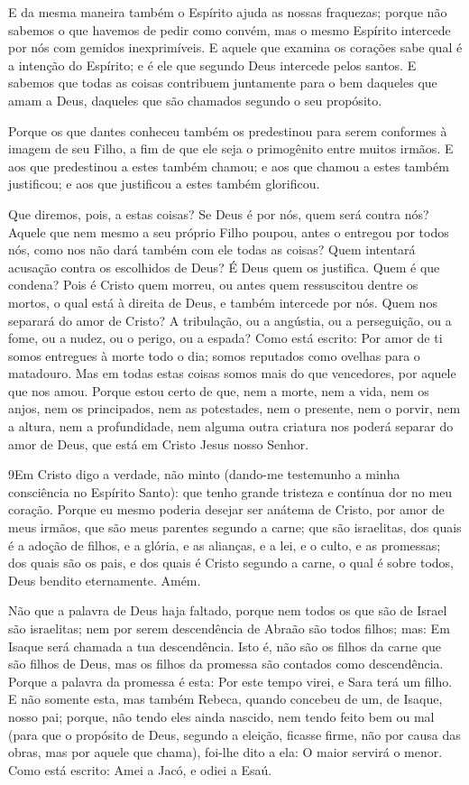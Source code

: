 E da mesma maneira também o Espírito ajuda as nossas fraquezas;
porque não sabemos o que havemos de pedir como convém, mas o mesmo
Espírito intercede por nós com gemidos inexprimíveis. E
aquele que examina os corações sabe qual é a intenção do Espírito; e
é ele que segundo Deus intercede pelos santos. E sabemos que
todas as coisas contribuem juntamente para o bem daqueles que amam a
Deus, daqueles que são chamados segundo o seu propósito.

Porque os que dantes conheceu também os predestinou para serem
conformes à imagem de seu Filho, a fim de que ele seja o primogênito
entre muitos irmãos. E aos que predestinou a estes também
chamou; e aos que chamou a estes também justificou; e aos que
justificou a estes também glorificou.

Que diremos, pois, a estas coisas? Se Deus é por nós, quem será
contra nós? Aquele que nem mesmo a seu próprio Filho poupou,
antes o entregou por todos nós, como nos não dará também com ele
todas as coisas? Quem intentará acusação contra os escolhidos
de Deus? É Deus quem os justifica. Quem é que condena? Pois é
Cristo quem morreu, ou antes quem ressuscitou dentre os mortos, o
qual está à direita de Deus, e também intercede por nós. Quem
nos separará do amor de Cristo? A tribulação, ou a angústia, ou a
perseguição, ou a fome, ou a nudez, ou o perigo, ou a espada?
Como está escrito: Por amor de ti somos entregues à morte
todo o dia; somos reputados como ovelhas para o matadouro.
Mas em todas estas coisas somos mais do que vencedores, por
aquele que nos amou. Porque estou certo de que, nem a morte,
nem a vida, nem os anjos, nem os principados, nem as potestades, nem
o presente, nem o porvir, nem a altura, nem a profundidade,
nem alguma outra criatura nos poderá separar do amor de Deus, que
está em Cristo Jesus nosso Senhor.

\medskip

\lettrine{9} Em Cristo digo a verdade, não minto (dando-me
testemunho a minha consciência no Espírito Santo): que tenho
grande tristeza e contínua dor no meu coração. Porque eu mesmo
poderia desejar ser anátema de Cristo, por amor de meus irmãos, que
são meus parentes segundo a carne; que são israelitas, dos quais
é a adoção de filhos, e a glória, e as alianças, e a lei, e o culto,
e as promessas; dos quais são os pais, e dos quais é Cristo
segundo a carne, o qual é sobre todos, Deus bendito eternamente.
Amém.

Não que a palavra de Deus haja faltado, porque nem todos os que
são de Israel são israelitas; nem por serem descendência de
Abraão são todos filhos; mas: Em Isaque será chamada a tua
descendência. Isto é, não são os filhos da carne que são filhos
de Deus, mas os filhos da promessa são contados como descendência.
Porque a palavra da promessa é esta: Por este tempo virei, e
Sara terá um filho. E não somente esta, mas também Rebeca,
quando concebeu de um, de Isaque, nosso pai; porque, não
tendo eles ainda nascido, nem tendo feito bem ou mal (para que o
propósito de Deus, segundo a eleição, ficasse firme, não por causa
das obras, mas por aquele que chama), foi-lhe dito a ela: O
maior servirá o menor. Como está escrito: Amei a Jacó, e
odiei a Esaú.

